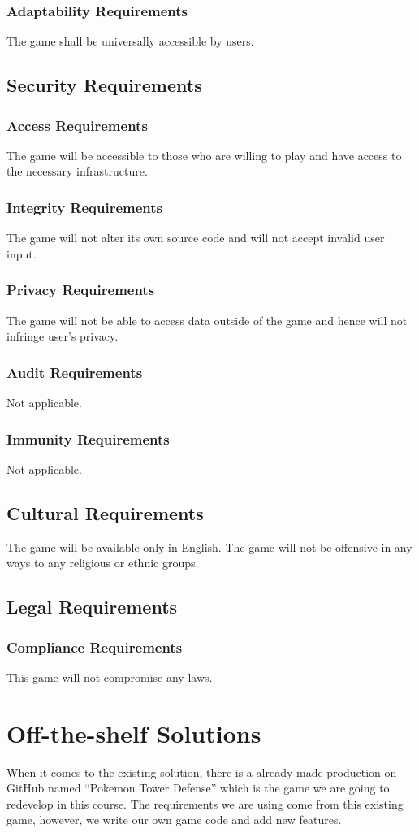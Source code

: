 \documentclass{article}
\begin{document}
\subsubsection{Adaptability Requirements}
The game shall be universally accessible by users.

\subsection{Security Requirements}
\subsubsection{Access Requirements}
The game will be accessible to those who are willing to play and have access to the necessary infrastructure. 
\subsubsection{Integrity Requirements}
The game will not alter its own source code and will not accept invalid user input.
\subsubsection{Privacy Requirements}
The game will not be able to access data outside of the game and hence will not infringe user’s privacy.
\subsubsection{Audit Requirements}
Not applicable.
\subsubsection{Immunity Requirements}
Not applicable.

\subsection{Cultural Requirements}
The game will be available only in English. The game will not be offensive in any ways to any religious or ethnic groups.

\subsection{Legal Requirements}
\subsubsection{Compliance Requirements}
This game will not compromise any laws.

\section{Off-the-shelf Solutions}
When it comes to the existing solution, there is a already made production on GitHub named “Pokemon Tower Defense” which is the game we are going to redevelop in this course. The requirements we are using come from this existing game, however, we write our own game code and add new features.

 
\end{document}
